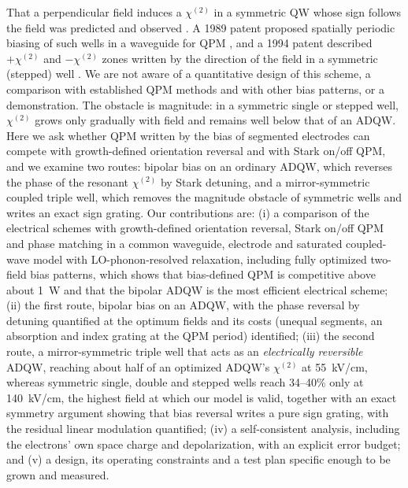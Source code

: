 \documentclass[11pt]{article}
\newcommand{\chitwo}{\chi^{(2)}}
\begin{document}
That a perpendicular field induces a $\chitwo$ in a symmetric QW whose sign follows the field was predicted \cite{Tsang1988} and observed \cite{Fejer1989}. A 1989 patent proposed spatially periodic biasing of such wells in a waveguide for QPM \cite{Patent4880297}, and a 1994 patent described $+\chitwo$ and $-\chitwo$ zones written by the direction of the field in a symmetric (stepped) well \cite{Patent5289309}. We are not aware of a quantitative design of this scheme, a comparison with established QPM methods and with other bias patterns, or a demonstration. The obstacle is magnitude: in a symmetric single or stepped well, $\chitwo$ grows only gradually with field and remains well below that of an ADQW. Here we ask whether QPM written by the bias of segmented electrodes can compete with growth-defined orientation reversal and with Stark on/off QPM, and we examine two routes: bipolar bias on an ordinary ADQW, which reverses the phase of the resonant $\chitwo$ by Stark detuning, and a mirror-symmetric coupled triple well, which removes the magnitude obstacle of symmetric wells and writes an exact sign grating. Our contributions are: (i) a comparison of the electrical schemes with growth-defined orientation reversal, Stark on/off QPM and phase matching in a common waveguide, electrode and saturated coupled-wave model with LO-phonon-resolved relaxation, including fully optimized two-field bias patterns, which shows that bias-defined QPM is competitive above about 1~W and that the bipolar ADQW is the most efficient electrical scheme; (ii) the first route, bipolar bias on an ADQW, with the phase reversal by detuning quantified at the optimum fields and its costs (unequal segments, an absorption and index grating at the QPM period) identified; (iii) the second route, a mirror-symmetric triple well that acts as an \emph{electrically reversible} ADQW, reaching about half of an optimized ADQW's $\chitwo$ at 55~kV/cm, whereas symmetric single, double and stepped wells reach 34--40\% only at 140~kV/cm, the highest field at which our model is valid, together with an exact symmetry argument showing that bias reversal writes a pure sign grating, with the residual linear modulation quantified; (iv) a self-consistent analysis, including the electrons' own space charge and depolarization, with an explicit error budget; and (v) a design, its operating constraints and a test plan specific enough to be grown and measured.
\end{document}

